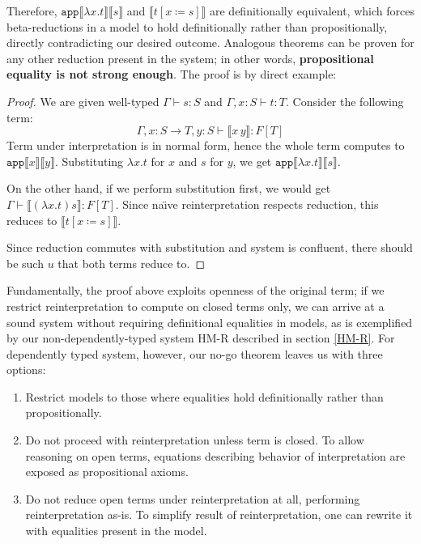 Therefore, $\mathtt{app}\llbracket\lambda x.t\rrbracket
\llbracket s \rrbracket$ and $\llbracket t[x\coloneqq s]
\rrbracket$ are definitionally equivalent, which forces
beta-reductions in a model to hold definitionally rather
than propositionally, directly contradicting our desired
outcome. Analogous theorems can be proven for any other
reduction present in the system; in other words,
\textbf{propositional equality is not strong enough}.
The proof is by direct example:

\begin{proof}
    We are given well-typed $\Gamma\vdash s:S$ and
    $\Gamma,x:S\vdash t:T$. Consider the following term:
    \[
        \Gamma,x:S\to T,y:S\vdash
            \llbracket x\,y\rrbracket:F[T]
    \]
    Term under interpretation is in normal form, hence
    the whole term computes to $\mathtt{app}\llbracket x
    \rrbracket\llbracket y\rrbracket$.
    Substituting $\lambda x.t$ for $x$ and $s$ for $y$,
    we get $\mathtt{app}\llbracket\lambda x.t\rrbracket
    \llbracket s \rrbracket$.

    On the other hand, if we perform substitution first,
    we would get $\Gamma\vdash\llbracket(\lambda x.t)s
    \rrbracket:F[T]$. Since na\"{\i}ve reinterpretation
    respects reduction, this reduces to
    $\llbracket t[x\coloneqq s] \rrbracket$.

    Since reduction commutes with substitution and
    system is confluent, there should be such $u$ that
    both terms reduce to.
\end{proof}

Fundamentally, the proof above exploits openness of the
original term; if we restrict reinterpretation to
compute on closed terms only, we can arrive at a sound
system without requiring definitional equalities in
models, as is exemplified by our non-dependently-typed
system HM-R described in section \ref{HM-R}. For
dependently typed system, however, our no-go theorem
leaves us with three options:

\begin{enumerate}
    \item Restrict models to those where equalities hold
        definitionally rather than propositionally.
    \item Do not proceed with reinterpretation unless
        term is closed. To allow reasoning on open
        terms, equations describing behavior of
        interpretation are exposed as propositional
        axioms.
    \item Do not reduce open terms under
        reinterpretation at all, performing
        reinterpretation as-is. To simplify result of
        reinterpretation, one can rewrite it with
        equalities present in the model.
\end{enumerate}

